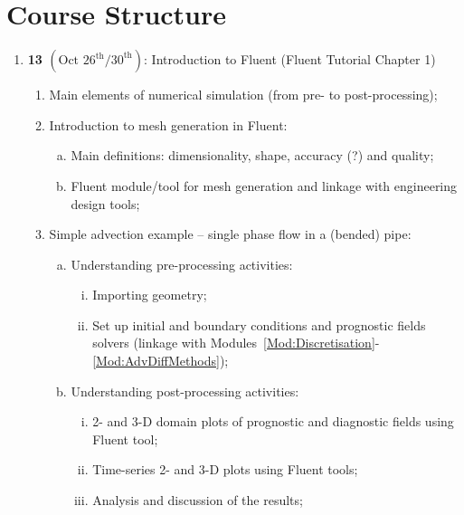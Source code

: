 \documentclass[12pts,a4paper,amsmath,amssymb,floatfix]{article}%
\begin{document}
\pagebreak

\section{Course Structure}

\begin{enumerate}[{\bf Week}]
   \item {\bf 13 $\left(\text{Oct 26}^{\text{th}}\text{/30}^{\text{th}}\right)$}: Introduction to Fluent (Fluent Tutorial Chapter 1)
      \begin{enumerate}[1]
         \item Main elements of numerical simulation (from pre- to post-processing);
         \item Introduction to mesh generation in Fluent:
             \begin{enumerate}[(a)]
                \item Main definitions: dimensionality, shape, accuracy (?) and quality;
                \item Fluent module/tool for mesh generation and linkage with engineering design tools; 
             \end{enumerate}
         \item Simple advection example -- single phase flow in a (bended) pipe:
             \begin{enumerate}[(a)]
                \item Understanding pre-processing activities: 
                   \begin{enumerate}[(i)]
                      \item Importing geometry;
                      \item Set up initial and boundary conditions and prognostic fields solvers (linkage with Modules~\ref{Mod:Discretisation}-\ref{Mod:AdvDiffMethods});
                   \end{enumerate}
                \item Understanding post-processing activities:  
                   \begin{enumerate}[(i)]
                      \item 2- and 3-D domain plots of prognostic and diagnostic fields using Fluent tool;
                      \item Time-series 2- and 3-D plots using Fluent tools;
                      \item Analysis and discussion of the results;
                   \end{enumerate}

\end{enumerate}
\end{enumerate}
\end{enumerate}
\end{document}
